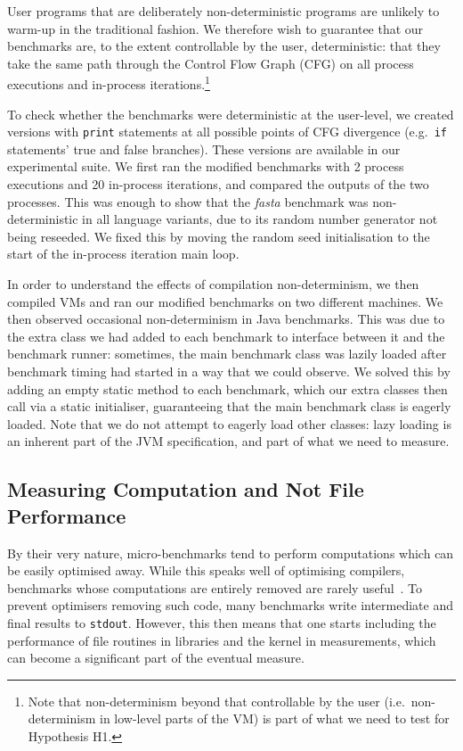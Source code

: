 \documentclass[preprint,numbers,10pt]{sigplanconf}
\newcommand{\fasta}{\emph{fasta}\xspace}
\begin{document}
User programs that are deliberately non-deterministic programs are unlikely to
warm-up in the traditional fashion.
We therefore wish to guarantee that our benchmarks are,
to the extent controllable by the user, deterministic: that they
take the same path through the Control Flow Graph (CFG)
on all process executions and in-process iterations.\footnote{Note that non-determinism
beyond that controllable by the user (i.e.~non-determinism in low-level parts of
the VM) is part of what we need to test for Hypothesis H1.}

To check whether the benchmarks were deterministic at the user-level, we created
versions with \texttt{print} statements at all possible points of CFG
divergence (e.g.~\texttt{if} statements' true and false branches).
These versions are available in our experimental suite. We first ran the modified
benchmarks with 2 process executions and 20 in-process iterations,
and compared the outputs of the two processes. This was enough to show that the
\fasta benchmark was non-deterministic
in all language variants, due to its random number generator not being reseeded. We
fixed this by moving the random seed initialisation to the start
of the in-process iteration main loop.

In order to understand the effects of compilation non-determinism,
we then compiled VMs and ran our modified benchmarks on two different machines.
We then observed occasional non-determinism in Java benchmarks.
This was due to the extra class we had added to each benchmark
to interface between it and the benchmark runner: sometimes, the
main benchmark class was lazily loaded after benchmark timing had started in a
way that we could observe. We
solved this by adding an empty static method to each benchmark, which our
extra classes then call via a static initialiser, guaranteeing that
the main benchmark class is eagerly loaded. Note that we do not attempt to eagerly
load other classes: lazy loading is an inherent part of the JVM specification,
and part of what we need to measure.


\subsection{Measuring Computation and Not File Performance}

By their very nature, micro-benchmarks tend to perform computations which
can be easily optimised away. While this speaks well of
optimising compilers, benchmarks whose computations
are entirely removed are rarely useful~\cite{seaton15phd}. To prevent optimisers
removing such code, many benchmarks write intermediate and final results
to \texttt{stdout}. However, this then means that one starts including
the performance of file routines in libraries and the kernel in measurements,
which can become a significant part of the eventual measure.
\end{document}
